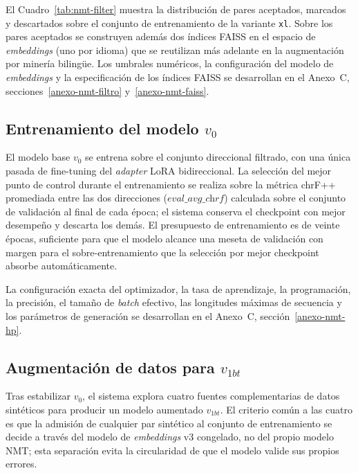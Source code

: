\documentclass[12pt,a4paper,oneside]{book}
\begin{document}
El Cuadro~\ref{tab:nmt-filter} muestra la distribución de pares aceptados, marcados y descartados sobre el conjunto de entrenamiento de la variante \texttt{xl}. Sobre los pares aceptados se construyen además dos índices FAISS \parencite{johnson2019faiss} en el espacio de \emph{embeddings} (uno por idioma) que se reutilizan más adelante en la augmentación por minería bilingüe. Los umbrales numéricos, la configuración del modelo de \emph{embeddings} y la especificación de los índices FAISS se desarrollan en el Anexo~C, secciones~\ref{anexo-nmt-filtro} y~\ref{anexo-nmt-faiss}.

\begin{table}[h]
\centering
\caption{Distribución de pares en el conjunto de entrenamiento tras el filtro semántico (variante \texttt{xl}).}
\label{tab:nmt-filter}

\end{table}

\subsection{Entrenamiento del modelo \texorpdfstring{\(v_0\)}{v0}}\label{nmt-entrenamiento}

El modelo base \(v_0\) se entrena sobre el conjunto direccional filtrado, con una única pasada de fine-tuning del \emph{adapter} LoRA bidireccional. La selección del mejor punto de control durante el entrenamiento se realiza sobre la métrica chrF++ promediada entre las dos direcciones (\(\textit{eval\_avg\_chrf}\)) calculada sobre el conjunto de validación al final de cada época; el sistema conserva el checkpoint con mejor desempeño y descarta los demás. El presupuesto de entrenamiento es de veinte épocas, suficiente para que el modelo alcance una meseta de validación con margen para el sobre-entrenamiento que la selección por mejor checkpoint absorbe automáticamente.

La configuración exacta del optimizador, la tasa de aprendizaje, la programación, la precisión, el tamaño de \emph{batch} efectivo, las longitudes máximas de secuencia y los parámetros de generación se desarrollan en el Anexo~C, sección~\ref{anexo-nmt-hp}.

\subsection{Augmentación de datos para \texorpdfstring{\(v_{1bt}\)}{v1bt}}\label{nmt-aumentacion}

Tras estabilizar \(v_0\), el sistema explora cuatro fuentes complementarias de datos sintéticos para producir un modelo aumentado \(v_{1bt}\). El criterio común a las cuatro es que la admisión de cualquier par sintético al conjunto de entrenamiento se decide a través del modelo de \emph{embeddings} v3 congelado, no del propio modelo NMT; esta separación evita la circularidad de que el modelo valide sus propios errores.
\end{document}
